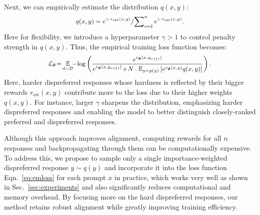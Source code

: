 Next, we can empirically estimate the distribution $ q(x, y) $:
\begin{equation*}
	\fontsize{9}{3}\selectfont{
		\begin{aligned}
			\label{eq:asfdsf}
		 q(x, y) = {e^{ \gamma \cdot r_{\text{est}} (x,y)}  }/{ \sum\nolimits_{i=2}^{n}e^{\gamma\cdot  r_{\text{est}} (x,y)}}.
	\end{aligned}}
\end{equation*}
Here for flexibility, we introduce a hyperparameter $\gamma>1$ to control penalty strength in $q(x,y)$.  
 Thus, the empirical  training loss function becomes: 
\begin{equation}
	\fontsize{9}{3}\selectfont{
		\begin{aligned}
        \label{eq:emloss}
		\mathcal{L}_{\wm}\!=\! \expectation_{d\sim\mathcal{D}}   \!
			\!-\!\log\left(\frac{e^{{ r_{\wm}(x,y_{\tau\left( 1\right)})}}}{e^{{ r_{\wm}(x,y_{\tau\left( 1\right)})}}\!+\! N\cdot\expectation\nolimits_{y \sim p(y)}\left[e^{{r_{\wm}(x,y)}} q(x,y)\right]}\right).
	\end{aligned}}
\end{equation}
Here, harder dispreferred responses whose hardness is reflected by their bigger rewards $r_{\text{est}} (x,y)$ contribute more to the loss due to their higher weights \( q(x, y)\). For instance, larger \(\gamma\) sharpens the distribution, emphasizing harder dispreferred responses and enabling the model to better distinguish closely-ranked preferred and dispreferred responses.

 Although this approach improves alignment, computing rewards for all \(n\) responses and backpropagating through them can be computationally expensive. To address this, we propose to sample only a single importance-weighted dispreferred response \(y \sim  q(y)\) and incorporate it into the loss function Eqn.~\eqref{eq:emloss} for each prompt $x$ in practice, which works very well as shown in Sec.~\ref{sec:experiments} and also significantly reduces computational and memory overhead. By focusing more on the hard dispreferred responses, our method retains robust alignment while greatly improving training efficiency. 
 
